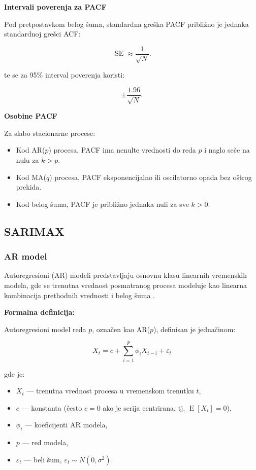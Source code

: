 \documentclass[12pt]{article}
\begin{document}
\bigskip

\noindent \textbf{Intervali poverenja za PACF}

Pod pretpostavkom belog šuma, standardna greška PACF približno je jednaka standardnoj grešci ACF:

\[
\operatorname{SE} \approx \frac{1}{\sqrt{N}}.
\]

te se za 95\% interval poverenja koristi:

\[
\pm \frac{1.96}{\sqrt{N}}.
\]

\bigskip

\noindent \textbf{Osobine PACF}

Za slabo stacionarne procese:

\begin{itemize}
    \item Kod AR($p$) procesa, PACF ima nenulte vrednosti do reda $p$ i naglo seče na nulu za $k>p$.
    \item Kod MA($q$) procesa, PACF eksponencijalno ili oscilatorno opada bez oštrog prekida.
    \item Kod belog šuma, PACF je približno jednaka nuli za sve $k>0$.
\end{itemize}

\subsection{SARIMAX}

\subsubsection{AR model}

Autoregresioni (AR) modeli predstavljaju osnovnu klasu linearnih vremenskih modela, gde se trenutna vrednost posmatranog procesa modeluje kao linearna kombinacija prethodnih vrednosti i belog šuma \cite{box1970, brockwell2002}.

\noindent\textbf{Formalna definicija:}

Autoregresioni model reda $p$, označen kao AR($p$), definisan je jednačinom:

\begin{equation}
X_t = c + \sum_{i=1}^{p} \phi_i X_{t-i} + \varepsilon_t
\end{equation}

gde je:
\begin{itemize}
    \item $X_t$ — trenutna vrednost procesa u vremenskom trenutku $t$,
    \item $c$ — konstanta (često $c=0$ ako je serija centrirana, tj. $\operatorname{E}[X_t]=0$),
    \item $\phi_i$ — koeficijenti AR modela,
    \item $p$ — red modela,
    \item $\varepsilon_t$ — beli šum, $\varepsilon_t \sim N(0, \sigma^2)$.
\end{itemize}
\end{document}
